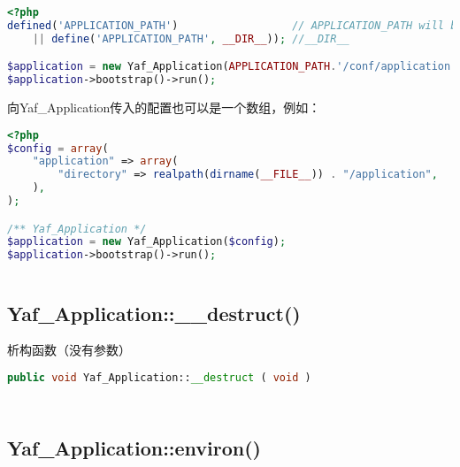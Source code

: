 \begin{lstlisting}[language=PHP]
<?php
defined('APPLICATION_PATH')                  // APPLICATION_PATH will be used in the ini config file
    || define('APPLICATION_PATH', __DIR__)); //__DIR__ 

$application = new Yaf_Application(APPLICATION_PATH.'/conf/application.ini');
$application->bootstrap()->run();
\end{lstlisting}

向Yaf\_Application传入的配置也可以是一个数组，例如：

\begin{lstlisting}[language=PHP]
<?php
$config = array(
    "application" => array(
        "directory" => realpath(dirname(__FILE__)) . "/application",
    ),
);

/** Yaf_Application */
$application = new Yaf_Application($config);
$application->bootstrap()->run();
\end{lstlisting}



\begin{lstlisting}[language=PHP]

\end{lstlisting}


\subsection{Yaf\_Application::\_\_destruct()}

析构函数（没有参数）






\begin{lstlisting}[language=PHP]
public void Yaf_Application::__destruct ( void )
\end{lstlisting}



\begin{lstlisting}[language=PHP]

\end{lstlisting}



\begin{lstlisting}[language=PHP]

\end{lstlisting}


\subsection{Yaf\_Application::environ()}

